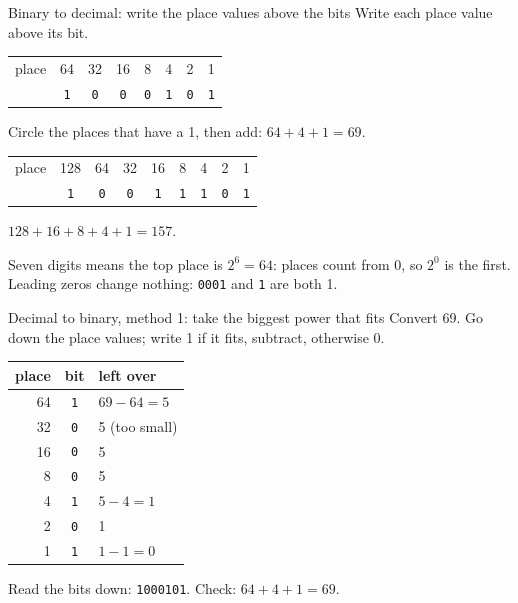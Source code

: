 \documentclass[aspectratio=169,10pt]{beamer}
\newcommand{\gc}[1]{\textcolor{black!60}{\footnotesize #1}}
\begin{document}
\begin{frame}{Binary to decimal: write the place values above the bits}
Write each place value above its bit.\par\medskip
{\LARGE\begin{tabular}{@{}l@{\ \ }c@{\ \ }c@{\ \ }c@{\ \ }c@{\ \ }c@{\ \ }c@{\ \ }c@{}}
\gc{place} & \gc{64} & \gc{32} & \gc{16} & \gc{8} & \gc{4} & \gc{2} & \gc{1}\\
 & \texttt{1} & \texttt{0} & \texttt{0} & \texttt{0} & \texttt{1} & \texttt{0} & \texttt{1}
\end{tabular}}\par\smallskip
Circle the places that have a 1, then add: $64+4+1=69$.\par\medskip
{\LARGE\begin{tabular}{@{}l@{\ \ }c@{\ \ }c@{\ \ }c@{\ \ }c@{\ \ }c@{\ \ }c@{\ \ }c@{\ \ }c@{}}
\gc{place} & \gc{128} & \gc{64} & \gc{32} & \gc{16} & \gc{8} & \gc{4} & \gc{2} & \gc{1}\\
 & \texttt{1} & \texttt{0} & \texttt{0} & \texttt{1} & \texttt{1} & \texttt{1} & \texttt{0} & \texttt{1}
\end{tabular}}\par\smallskip
$128+16+8+4+1=157$.\par\medskip
\small Seven digits means the top place is $2^6=64$: places count from 0, so $2^0$ is the first. Leading zeros change nothing: \texttt{0001} and \texttt{1} are both 1.
\end{frame}

\begin{frame}{Decimal to binary, method 1: take the biggest power that fits}
Convert 69. Go down the place values; write 1 if it fits, subtract, otherwise 0.
\begin{center}
\begin{tabular}{r|c|l}
\textbf{place} & \textbf{bit} & \textbf{left over}\\\hline
64 & \texttt{1} & $69-64=5$\\
32 & \texttt{0} & 5 (too small)\\
16 & \texttt{0} & 5\\
8 & \texttt{0} & 5\\
4 & \texttt{1} & $5-4=1$\\
2 & \texttt{0} & 1\\
1 & \texttt{1} & $1-1=0$
\end{tabular}
\end{center}
Read the bits down: \texttt{1000101}. Check: $64+4+1=69$.
\end{frame}
\end{document}
